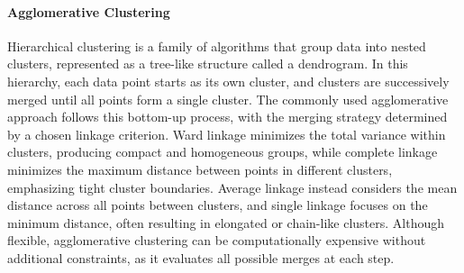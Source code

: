 \paragraph{Agglomerative Clustering}
\label{sec:background_ml_ac}

Hierarchical clustering is a family of algorithms that group data into nested clusters, represented as a tree-like structure called a dendrogram. In this hierarchy, each data point starts as its own cluster, and clusters are successively merged until all points form a single cluster. The commonly used agglomerative approach follows this bottom-up process, with the merging strategy determined by a chosen linkage criterion. Ward linkage minimizes the total variance within clusters, producing compact and homogeneous groups, while complete linkage minimizes the maximum distance between points in different clusters, emphasizing tight cluster boundaries. Average linkage instead considers the mean distance across all points between clusters, and single linkage focuses on the minimum distance, often resulting in elongated or chain-like clusters. Although flexible, agglomerative clustering can be computationally expensive without additional constraints, as it evaluates all possible merges at each step.

